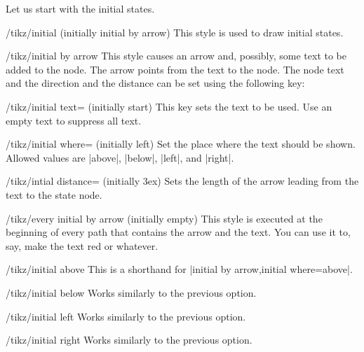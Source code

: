 Let us start with the initial states.
\begin{stylekey}{/tikz/initial (initially initial by arrow)}
  This style is used to draw initial states.
\end{stylekey}
\begin{stylekey}{/tikz/initial by arrow}
  This style causes an arrow and, possibly, some text to be added to
  the node. The arrow points from the text to the node. The node text
  and the direction and the distance can be set using the following
  key:
  \begin{key}{/tikz/initial text= (initially start)}
    This key sets the text to be used. Use an empty text to suppress
    all text.
  \end{key}
  \begin{key}{/tikz/initial where= (initially left)}
    Set the place where the text should be shown. Allowed values are
    |above|, |below|, |left|, and |right|.
  \end{key}
  \begin{key}{/tikz/intial distance= (initially 3ex)}
    Sets the length of the arrow leading from the text to the state
    node.
  \end{key}
  \begin{stylekey}{/tikz/every initial by arrow (initially \normalfont empty)}
    This style is executed at the beginning of every path that contains
    the arrow and the text. You can use it to, say, make the text red or
    whatever.
  \end{stylekey}
\begin{codeexample}[]
\end{codeexample}
\end{stylekey}
\begin{stylekey}{/tikz/initial above}
  This is a shorthand for |initial by arrow,initial where=above|.
\end{stylekey}
\begin{stylekey}{/tikz/initial below}
  Works similarly to the previous option.
\end{stylekey}
\begin{stylekey}{/tikz/initial left}
  Works similarly to the previous option.
\end{stylekey}
\begin{stylekey}{/tikz/initial right}
  Works similarly to the previous option.
\end{stylekey}

